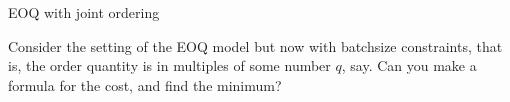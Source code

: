 \begin{exercise}

\end{exercise}



\begin{exercise}
EOQ with joint ordering

\end{exercise}

\begin{exercise}
  Consider the setting of the EOQ model but now with batchsize
  constraints, that is, the order quantity is in multiples of some number $q$, say. Can you make a formula for the cost, and find the minimum?

\end{exercise}



